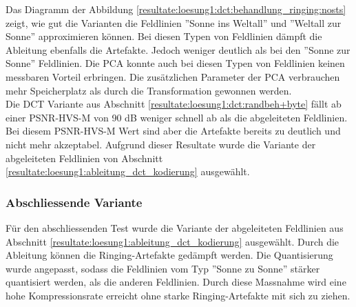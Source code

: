 Das Diagramm der Abbildung  \ref{resultate:loesung1:dct:behandlung_ringing:nosts} zeigt, wie gut die Varianten die Feldlinien ''Sonne ins Weltall'' und ''Weltall zur Sonne'' approximieren können. Bei diesen Typen von Feldlinien dämpft die Ableitung ebenfalls die Artefakte. Jedoch weniger deutlich als bei den ''Sonne zur Sonne'' Feldlinien. Die PCA konnte auch bei diesen Typen von Feldlinien keinen messbaren Vorteil erbringen. Die zusätzlichen Parameter der PCA verbrauchen mehr Speicherplatz als durch die Transformation gewonnen werden.\\
Die DCT Variante aus Abschnitt \ref{resultate:loesung1:dct:randbeh+byte} fällt ab einer PSNR-HVS-M von 90 dB weniger schnell ab als die abgeleiteten Feldlinien. Bei diesem PSNR-HVS-M Wert sind aber die Artefakte bereits zu deutlich und nicht mehr akzeptabel. Aufgrund dieser Resultate wurde die Variante der abgeleiteten Feldlinien von Abschnitt \ref{resultate:loesung1:ableitung_dct_kodierung} ausgewählt. 

\subsubsection{Abschliessende Variante}
Für den abschliessenden Test wurde die Variante der abgeleiteten Feldlinien aus Abschnitt \ref{resultate:loesung1:ableitung_dct_kodierung} ausgewählt. Durch die Ableitung können die Ringing-Artefakte gedämpft werden. Die Quantisierung wurde angepasst, sodass die Feldlinien vom Typ ''Sonne zu Sonne'' stärker quantisiert werden, als die anderen Feldlinien. Durch diese Massnahme wird eine hohe Kompressionsrate erreicht ohne starke Ringing-Artefakte mit sich zu ziehen.

